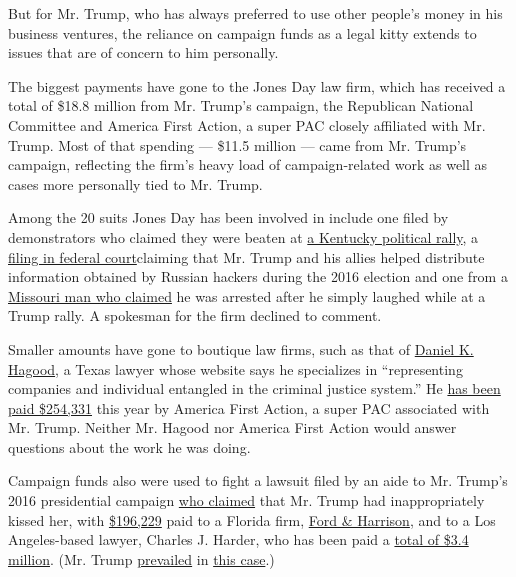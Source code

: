 But for Mr. Trump, who has always preferred to use other people's money
in his business ventures, the reliance on campaign funds as a legal
kitty extends to issues that are of concern to him personally.

The biggest payments have gone to the Jones Day law firm, which has
received a total of \$18.8 million from Mr. Trump's campaign, the
Republican National Committee and America First Action, a super PAC
closely affiliated with Mr. Trump. Most of that spending --- \$11.5
million --- came from Mr. Trump's campaign, reflecting the firm's heavy
load of campaign-related work as well as cases more personally tied to
Mr. Trump.

Among the 20 suits Jones Day has been involved in include one filed by
demonstrators who claimed they were beaten at
\href{https://law.justia.com/cases/federal/appellate-courts/ca6/17-6290/17-6290-2018-09-11.html}{a
Kentucky political rally}, a
\href{https://www.courtlistener.com/recap/gov.uscourts.dcd.187894.1.0.pdf}{filing
in federal court}claiming that Mr. Trump and his allies helped
distribute information obtained by Russian hackers during the 2016
election and one from a
\href{https://int.graylady3jvrrxbe.onion/data/documenttools/rodney-brown-v/26436b775d5dfb03/full.pdf}{Missouri
man who claimed} he was arrested after he simply laughed while at a
Trump rally. A spokesman for the firm declined to comment.

Smaller amounts have gone to boutique law firms, such as that of
\href{https://sorrelshagood.com/danhagood/}{Daniel K. Hagood}, a Texas
lawyer whose website says he specializes in ``representing companies and
individual entangled in the criminal justice system.'' He
\href{https://www.fec.gov/data/disbursements/?data_type=processed\&recipient_name=DANIEL+K.+HAGOOD\&recipient_name=daniel+hagood}{has
been paid \$254,331} this year by America First Action, a super PAC
associated with Mr. Trump. Neither Mr. Hagood nor America First Action
would answer questions about the work he was doing.

Campaign funds also were used to fight a lawsuit filed by an aide to Mr.
Trump's 2016 presidential campaign
\href{https://www.courtlistener.com/docket/14567515/johnson-v-trump/}{who
claimed} that Mr. Trump had inappropriately kissed her, with
\href{https://www.fec.gov/data/disbursements/?data_type=processed\&committee_id=C00580100\&recipient_name=+HARRISON+LLP\&recipient_name=Ford+\&recipient_name=harrison\&max_date=04\%2F12\%2F2031\&disbursement_description=compliance\&disbursement_description=legal}{\$196,229}
paid to a Florida firm,
\href{https://www.courtlistener.com/docket/14567515/parties/johnson-v-trump/}{Ford
\& Harrison}, and to a Los Angeles-based lawyer, Charles J. Harder, who
has been paid a
\href{https://www.fec.gov/data/disbursements/?data_type=processed\&committee_id=C00580100\&recipient_name=Harder\&two_year_transaction_period=2020\&two_year_transaction_period=2018\&two_year_transaction_period=2016}{total
of \$3.4 million}. (Mr. Trump
\href{https://www.courtlistener.com/recap/gov.uscourts.flmd.360631/gov.uscourts.flmd.360631.96.0.pdf}{prevailed}
in \href{https://www.leagle.com/decision/infdco20190614c71}{this case}.)

